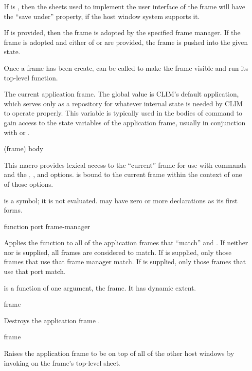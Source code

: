 If  is , then the sheets used to implement the user
interface of the frame will have the ``save under'' property, if the host window
system supports it.

If  is provided, then the frame is adopted by the specified
frame manager.  If the frame is adopted and either of  or
 are provided, the frame is pushed into the given state.

Once a frame has been create,  can be called to make the
frame visible and run its top-level function.


The current application frame.  The global value is CLIM's default application,
which serves only as a repository for whatever internal state is needed by CLIM
to operate properly.  This variable is typically used in the bodies of command
to gain access to the state variables of the application frame, usually in
conjunction with  or .

 {(frame) \body body}

This macro provides lexical access to the ``current'' frame for use with
commands and the , , and  options.
 is bound to the current frame within the context of one of those
options.

 is a symbol; it is not evaluated.   may have zero or more
declarations as its first forms.

 {function \key port frame-manager}

Applies the function  to all of the application frames that
``match''  and .  If neither  nor
 is supplied, all frames are considered to match.  If
 is supplied, only those frames that use that frame manager
match.  If  is supplied, only those frames that use that port match.

 is a function of one argument, the frame.  It has dynamic extent.


 {frame} 

Destroys the application frame .

 {frame}

Raises the application frame  to be on top of all of the other host
windows by invoking  on the frame's top-level sheet.

